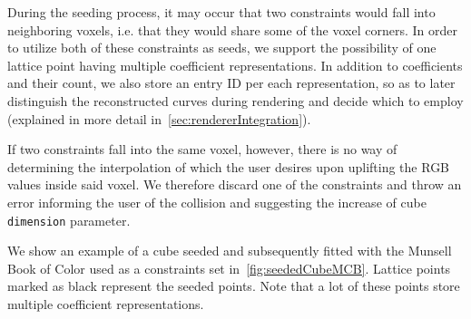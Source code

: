During the seeding process, it may occur that two constraints would fall into neighboring voxels, i.e. that they would share some of the voxel corners. In order to utilize both of these constraints as seeds, we support the possibility of one lattice point having multiple coefficient representations. In addition to coefficients and their count, we also store an entry ID per each representation, so as to later distinguish the reconstructed curves during rendering and decide which to employ (explained in more detail in~\cref{sec:rendererIntegration}).

If two constraints fall into the same voxel, however, there is no way of determining the interpolation of which the user desires upon uplifting the RGB values inside said voxel. We therefore discard one of the constraints and throw an error informing the user of the collision and suggesting the increase of cube \texttt{dimension} parameter.

We show an example of a cube seeded and subsequently fitted with the Munsell Book of Color used as a constraints set in~\cref{fig:seededCubeMCB}. Lattice points marked as black represent the seeded points. Note that a lot of these points store multiple coefficient representations.

